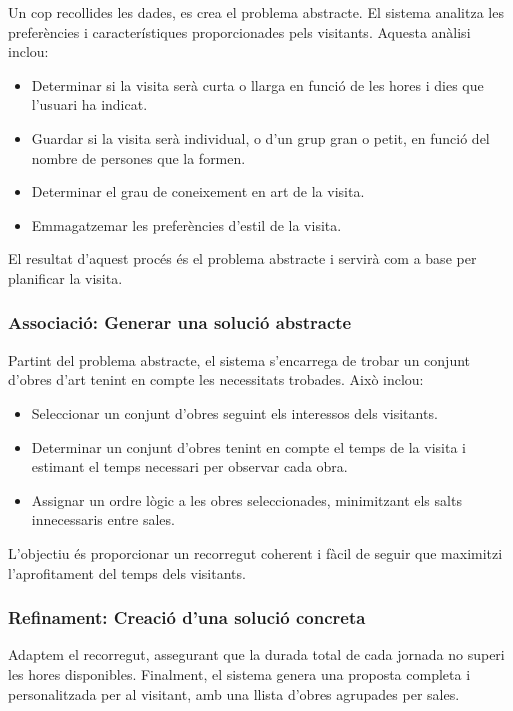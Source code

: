 \documentclass[a4paper]{article}
\begin{document}
	Un cop recollides les dades, es crea el problema abstracte. El sistema analitza les preferències i característiques proporcionades pels visitants. Aquesta anàlisi inclou:
	\begin{itemize}
		\item Determinar si la visita serà curta o llarga en funció de les hores i dies que l'usuari ha indicat.
		\item Guardar si la visita serà individual, o d'un grup gran o petit, en funció del nombre de persones que la formen.
		\item Determinar el grau de coneixement en art de la visita.
		\item Emmagatzemar les preferències d'estil de la visita.
	\end{itemize}
	
	El resultat d’aquest procés és el problema abstracte i servirà com a base per planificar la visita.
	
	
	\subsubsection{Associació: Generar una solució abstracte}

	Partint del problema abstracte, el sistema s’encarrega de trobar un conjunt d'obres d'art tenint en compte les necessitats trobades. Això inclou:
	\begin{itemize}
		\item Seleccionar un conjunt d'obres seguint els interessos dels visitants.
		\item Determinar un conjunt d'obres tenint en compte el temps de la visita i estimant el temps necessari per observar cada obra.
		\item Assignar un ordre lògic a les obres seleccionades, minimitzant els salts innecessaris entre sales.
	\end{itemize}
	
	L’objectiu és proporcionar un recorregut coherent i fàcil de seguir que maximitzi l’aprofitament del temps dels visitants.
	
	\subsubsection{Refinament: Creació d'una solució concreta}
	
	Adaptem el recorregut, assegurant que la durada total de cada jornada no superi les hores disponibles. Finalment, el sistema genera una proposta completa i personalitzada per al visitant, amb una llista d'obres agrupades per sales. \\
	
\end{document}
